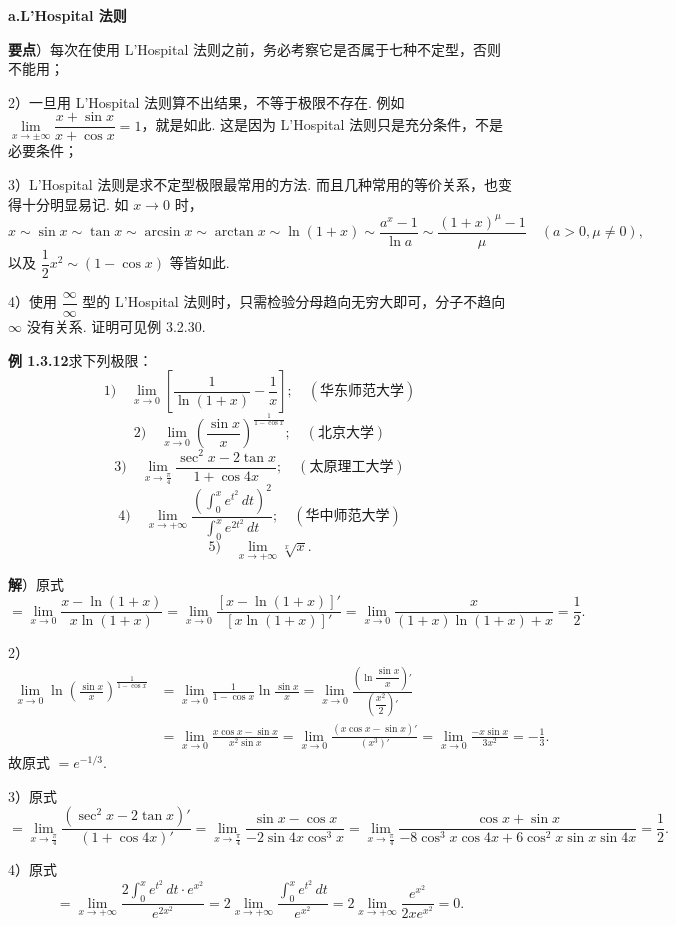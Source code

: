 \documentclass[UTF8, 12pt, fontset=fandol, oneside]{ctexart}
\begin{document}
\noindent\textbf{a.\quad L'Hospital 法则}

\noindent\textbf{要点}）每次在使用 L'Hospital 法则之前，务必考察它是否属于七种不定型，否则不能用；

2）一旦用 L'Hospital 法则算不出结果，不等于极限不存在. 例如 $\lim\limits_{x\to\pm\infty}\dfrac{x+\sin x}{x+\cos x}=1$，就是如此. 这是因为 L'Hospital 法则只是充分条件，不是必要条件；

3）L'Hospital 法则是求不定型极限最常用的方法. 而且几种常用的等价关系，也变得十分明显易记. 如 $x\to0$ 时，
\[
x\sim\sin x\sim\tan x\sim\arcsin x\sim\arctan x\sim\ln(1+x)
\sim\frac{a^x-1}{\ln a}\sim\frac{(1+x)^\mu-1}{\mu}\quad(a>0,\mu\ne0),
\]
以及 $\dfrac12x^2\sim(1-\cos x)$ 等皆如此.

4）使用 $\dfrac\infty\infty$ 型的 L'Hospital 法则时，只需检验分母趋向无穷大即可，分子不趋向 $\infty$ 没有关系. 证明可见例 3.2.30.

\noindent\textbf{例 1.3.12}\quad 求下列极限：
\[
1)\quad \lim_{x\to0}\left[\frac1{\ln(1+x)}-\frac1x\right];\quad(\text{华东师范大学})
\]
\[
2)\quad \lim_{x\to0}\left(\frac{\sin x}{x}\right)^{\frac1{1-\cos x}};\quad(\text{北京大学})
\]
\[
3)\quad \lim_{x\to\frac\pi4}\frac{\sec^2x-2\tan x}{1+\cos4x};\quad(\text{太原理工大学})
\]
\[
4)\quad \lim_{x\to+\infty}\frac{\left(\int_0^x e^{t^2}\,dt\right)^2}{\int_0^x e^{2t^2}\,dt};\quad(\text{华中师范大学})
\]
\[
5)\quad \lim_{x\to+\infty}\sqrt[x]{x}.
\]

\noindent\textbf{解}）原式
\[
=\lim_{x\to0}\frac{x-\ln(1+x)}{x\ln(1+x)}
=\lim_{x\to0}\frac{[x-\ln(1+x)]'}{[x\ln(1+x)]'}
=\lim_{x\to0}\frac{x}{(1+x)\ln(1+x)+x}
=\frac12.
\]

2）
\[
\begin{aligned}
\lim_{x\to0}\ln\left(\frac{\sin x}{x}\right)^{\frac1{1-\cos x}}
&=\lim_{x\to0}\frac1{1-\cos x}\ln\frac{\sin x}{x}
=\lim_{x\to0}\frac{\left(\ln\dfrac{\sin x}{x}\right)'}{\left(\dfrac{x^2}{2}\right)'}\\
&=\lim_{x\to0}\frac{x\cos x-\sin x}{x^2\sin x}
=\lim_{x\to0}\frac{(x\cos x-\sin x)'}{(x^3)'}
=\lim_{x\to0}\frac{-x\sin x}{3x^2}
=-\frac13.
\end{aligned}
\]
故原式 $=e^{-1/3}$.

3）原式
\[
=\lim_{x\to\frac\pi4}\frac{(\sec^2x-2\tan x)'}{(1+\cos4x)'}
=\lim_{x\to\frac\pi4}\frac{\sin x-\cos x}{-2\sin4x\cos^3x}
=\lim_{x\to\frac\pi4}\frac{\cos x+\sin x}{-8\cos^3x\cos4x+6\cos^2x\sin x\sin4x}
=\frac12.
\]

4）原式
\[
=\lim_{x\to+\infty}\frac{2\int_0^x e^{t^2}\,dt\cdot e^{x^2}}{e^{2x^2}}
=2\lim_{x\to+\infty}\frac{\int_0^x e^{t^2}\,dt}{e^{x^2}}
=2\lim_{x\to+\infty}\frac{e^{x^2}}{2xe^{x^2}}=0.
\]
\end{document}
